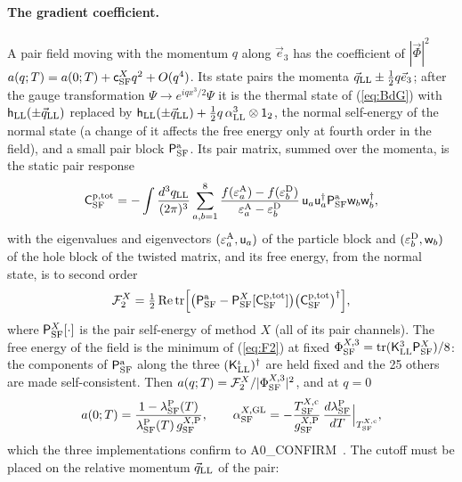 \documentclass[aps,prd,twocolumn,superscriptaddress,nofootinbib,floatfix,longbibliography]{revtex4-2}
\newcommand{\LL}{{\rm LL}}
\newcommand{\SF}{{\rm SF}}
\newcommand{\tr}{\mathrm{tr}}
\begin{document}
\paragraph*{The gradient coefficient.}
A pair field moving with the momentum $q$ along $\vec e_3$ has the coefficient of $|\vec\Phi|^2$
$a(q;T)=a(0;T)+\mathsf c^X_\SF q^2+O(q^4)$. Its state pairs the momenta $\vec q_\LL\pm\frac12q\vec e_3$; after the gauge transformation
$\Psi\to e^{iqx^3/2}\Psi$ it is the thermal state of (\ref{eq:BdG}) with $\mathsf h_\LL(\pm\vec q_\LL)$ replaced by
$\mathsf h_\LL(\pm\vec q_\LL)+\frac12q\,\alpha^3_\LL\otimes\mathsf 1_2$, the normal self-energy of the normal state (a change of
it affects the free energy only at fourth order in the field), and a small pair block $\mathsf P^{\rm a}_\SF$. Its pair matrix,
summed over the momenta, is the static pair response
\begin{equation}
\mathsf C^{\rm p,tot}_\SF=-\int\frac{d^3q_\LL}{(2\pi)^3}\sum_{a,b=1}^8\frac{f(\varepsilon^{\rm A}_a)-f(\varepsilon^{\rm D}_b)}{\varepsilon^{\rm A}_a-\varepsilon^{\rm D}_b}\,\mathsf u_a\mathsf u_a^\dagger\mathsf P^{\rm a}_\SF\mathsf w_b\mathsf w_b^\dagger ,
\label{eq:chi}
\end{equation}
with the eigenvalues and eigenvectors $(\varepsilon^{\rm A}_a,\mathsf u_a)$ of the particle block and
$(\varepsilon^{\rm D}_b,\mathsf w_b)$ of the hole block of the twisted matrix, and its free energy, from the normal state, is to
second order
\begin{equation}
\mathcal F^X_2=\tfrac12\,{\rm Re}\,\tr\Big[\big(\mathsf P^{\rm a}_\SF-\mathsf P^X_\SF[\mathsf C^{\rm p,tot}_\SF]\big)\big(\mathsf C^{\rm p,tot}_\SF\big)^\dagger\Big],
\label{eq:F2}
\end{equation}
where $\mathsf P^X_\SF[\cdot]$ is the pair self-energy of method $X$ (all of its pair channels). The free energy of the field is
the minimum of (\ref{eq:F2}) at fixed $\Phi^{X,3}_\SF=\tr(\mathsf K^3_\LL\mathsf P^X_\SF)/8$: the components of $\mathsf P^{\rm a}_\SF$ along
the three $(\mathsf K^\iota_\LL)^\dagger$ are held fixed and the 25 others are made self-consistent. Then
$a(q;T)=\mathcal F^X_2/|\Phi^{X,3}_\SF|^2$, and at $q=0$
\begin{equation}
a(0;T)=\frac{1-\lambda^{\rm P}_\SF(T)}{\lambda^{\rm P}_\SF(T)\,g^{X,{\rm P}}_\SF},\qquad\alpha^{X,{\rm GL}}_\SF=-\frac{T^{X,{\rm c}}_\SF}{g^{X,{\rm P}}_\SF}\,\frac{d\lambda^{\rm P}_\SF}{dT}\Big|_{T^{X,{\rm c}}_\SF},
\label{eq:a0}
\end{equation}
which the three implementations confirm to {{A0_CONFIRM}}~\cite{SM}. The cutoff must be placed on the relative momentum $\vec q_\LL$ of the pair:
\end{document}
